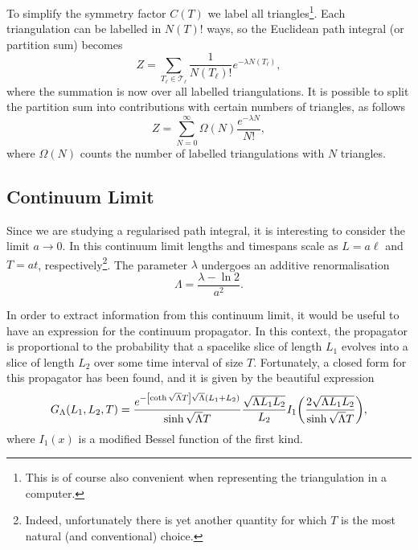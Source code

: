 To simplify the symmetry factor $C(T)$ we label all triangles\footnote{This is of course also convenient when representing the triangulation in a computer.}. Each triangulation can be labelled in $N(T)!$ ways, so the Euclidean path integral (or partition sum) becomes
\begin{equation}
    Z
    =
    \sum_{T_\ell \in \mathcal{T}_\ell} \frac{1}{N(T_\ell)!} e^{- \lambda N(T_\ell)}
    ,
\end{equation}
where the summation is now over all labelled triangulations. It is possible to split the partition sum into contributions with certain numbers of triangles, as follows
\begin{equation}\label{eq:part_sum}
    Z
    =
    \sum_{N = 0}^\infty \Omega(N) \frac{e^{- \lambda N}}{N!}
    ,
\end{equation}
where $\Omega(N)$ counts the number of labelled triangulations with $N$ triangles.

\subsection{Continuum Limit}

Since we are studying a regularised path integral, it is interesting to consider the limit $a \to 0$. In this continuum limit lengths and timespans scale as $L = a \ell$ and $T = a t$, respectively\footnote{Indeed, unfortunately there is yet another quantity for which $T$ is the most natural (and conventional) choice.}. The parameter $\lambda$ undergoes an additive renormalisation
\begin{equation}
    \Lambda = \frac{\lambda - \ln 2}{a^2}
    .
\end{equation}

In order to extract information from this continuum limit, it would be useful to have an expression for the continuum propagator. In this context, the propagator is proportional to the probability that a spacelike slice of length $L_1$ evolves into a slice of length $L_2$ over some time interval of size $T$. Fortunately, a closed form for this propagator has been found, and it is given by the beautiful expression \cite{1998}
\begin{equation}
    G_\Lambda(L_1, L_2, T)
    =
    \frac{
        e^{-\qty[\coth \sqrt{\Lambda} T] \sqrt{\Lambda} (L_1 + L_2)}
    }{
        \sinh \sqrt{\Lambda} T
    }
    \frac{\sqrt{\Lambda L_1 L_2}}{L_2}
    I_1 \qty(\frac{2 \sqrt{\Lambda L_1 L_2}}{\sinh \sqrt{\Lambda} T})
    ,
\end{equation}
where $I_1(x)$ is a modified Bessel function of the first kind.

